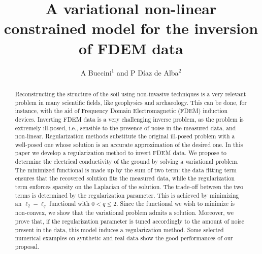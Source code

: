 \documentclass[final,leqno]{siamltex}
\title{A variational non-linear constrained model for the inversion of FDEM data}
\author{A Buccini$^1$ and P D\'iaz de Alba$^2$}
\begin{document}
\maketitle
	
	
	\begin{abstract}
		Reconstructing the structure of the soil using non-invasive techniques is a very relevant problem in many scientific fields, like geophysics and archaeology. This can be done, for instance, with the aid of Frequency Domain Electromagnetic (FDEM) induction devices. Inverting FDEM data is a very challenging inverse problem, as the problem is extremely ill-posed, i.e., sensible to the presence of noise in the measured data, and non-linear. Regularization methods substitute the original ill-posed problem with a well-posed one whose solution is an accurate approximation of the desired one. In this paper we develop a regularization method to invert FDEM data. We propose to determine the electrical conductivity of the ground by solving a variational problem. The minimized functional is made up by the sum of two term: the data fitting term ensures that the recovered solution fits the measured data, while the regularization term enforces sparsity on the Laplacian of the solution. The trade-off between the two terms is determined by the regularization parameter. This is achieved by minimizing an $\ell_2-\ell_q$ functional with $0<q\leq 2$. Since the functional we wish to minimize is non-convex, we show that the variational problem admits a solution. Moreover, we prove that, if the regularization parameter is tuned accordingly to the amount of noise present in the data, this model induces a regularization method. Some selected numerical examples on synthetic and real data show the good performances of our proposal.
	\end{abstract}
	
\end{document}
